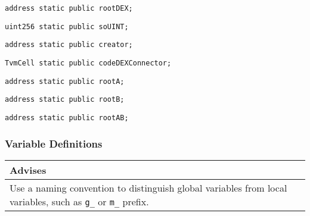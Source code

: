 \begin{lstlisting}[firstnumber=19]
  address static public rootDEX;
\end{lstlisting}

\begin{lstlisting}[firstnumber=20]
  uint256 static public soUINT;
\end{lstlisting}

\begin{lstlisting}[firstnumber=21]
  address static public creator;
\end{lstlisting}

\begin{lstlisting}[firstnumber=22]
  TvmCell static public codeDEXConnector;
\end{lstlisting}

\begin{lstlisting}[firstnumber=23]
  address static public rootA;
\end{lstlisting}

\begin{lstlisting}[firstnumber=24]
  address static public rootB;
\end{lstlisting}

\begin{lstlisting}[firstnumber=25]
  address static public rootAB;
\end{lstlisting}

\subsubsection{Variable Definitions}


\ifsoldraft
\noindent\begin{tabular}{|p{12cm}|}\hline
\rowcolor{green}Advises
\\\hline
Use a naming convention to distinguish global variables from local variables, such as \verb+g_+ or \verb+m_+ prefix.
\\\hline\end{tabular}
\fi

